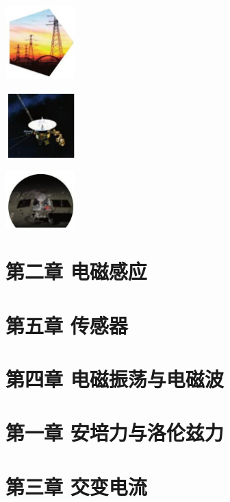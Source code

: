 \documentclass[10pt]{article}
\begin{document}
\begin{center}
\includegraphics[max width=0.2\textwidth]{images/01910e72-c5b7-7ed5-a6d4-fb3a5faefc32_4_120420.jpg}
\end{center}

\begin{center}
\includegraphics[max width=0.2\textwidth]{images/01910e72-c5b7-7ed5-a6d4-fb3a5faefc32_4_359198.jpg}
\end{center}

\begin{center}
\includegraphics[max width=0.2\textwidth]{images/01910e72-c5b7-7ed5-a6d4-fb3a5faefc32_4_917283.jpg}
\end{center}

\section*{第二章 电磁感应}

\section*{第五章 传感器}

\section*{第四章 电磁振荡与电磁波}

\section*{第一章 安培力与洛伦兹力}

\section*{第三章 交变电流}
\end{document}
